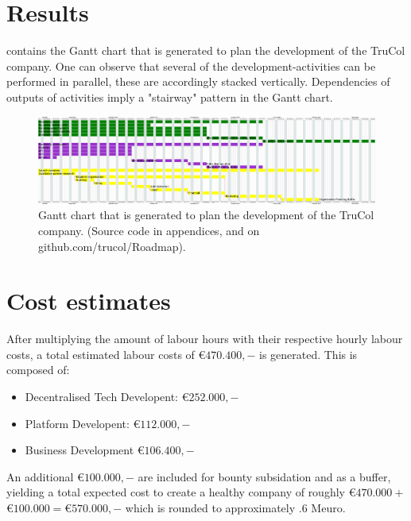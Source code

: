 \section{Results}\label{sec:results}
%
 contains the Gantt chart that is generated to plan the development of the TruCol company. One can observe that several of the development-activities can be performed in parallel, these are accordingly stacked vertically. Dependencies of outputs of activities imply a "stairway" pattern in the Gantt chart. 
\clearpage
\begin{figure}
\hspace*{-0cm}   
    \includegraphics[width=775pt]{Images/created.png}
    \caption{Gantt chart that is generated to plan the development of the TruCol company. (Source code in appendices, and on github.com/trucol/Roadmap).}
    \label{fig:gantt}
\end{figure}
\clearpage
\section{Cost estimates}
After multiplying the amount of labour hours with their respective hourly labour costs, a total estimated labour costs of \euro$470.400,-$ is generated. This is composed of:
\begin{itemize}
	\item Decentralised Tech Developent: \euro$252.000,-$ 
	\item Platform Developent: \euro$112.000,-$ 
	\item Business Development \euro$106.400,-$ 
\end{itemize}
An additional \euro$100.000,-$ are included for bounty subsidation and as a buffer, yielding a total expected cost to create a healthy company of roughly \euro$470.000+$\euro$100.000=$\euro$570.000,-$ which is rounded to approximately .6 Meuro.